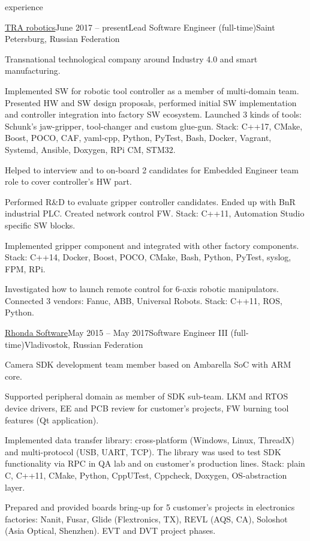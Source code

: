 \documentclass{template}
\begin{document}
\begin{rSection}{experience}
\begin{rCompany}{\href{https://www.tra.ai}{TRA robotics}}{June 2017 -- present}{Lead Software Engineer (full-time)}{Saint Petersburg, Russian Federation}

\item Transnational technological company around Industry 4.0 and smart manufacturing.
\item Implemented SW for robotic tool controller as a member of multi-domain team. Presented HW and SW design proposals, performed initial SW implementation and
      controller integration into factory SW ecosystem. Launched 3 kinds of tools: Schunk's jaw-gripper, tool-changer and custom glue-gun.
      Stack: C++17, CMake, Boost, POCO, CAF, yaml-cpp, Python, PyTest, Bash, Docker, Vagrant, Systemd, Ansible, Doxygen, RPi CM, STM32.
\item Helped to interview and to on-board 2 candidates for Embedded Engineer team role to cover controller's HW part.
\item Performed R\&D to evaluate gripper controller candidates. Ended up with BnR industrial PLC.
      Created network control FW. Stack: C++11, Automation Studio specific SW blocks.
\item Implemented gripper component and integrated with other factory components.
      Stack: C++14, Docker, Boost, POCO, CMake, Bash, Python, PyTest, syslog, FPM, RPi.
\item Investigated how to launch remote control for 6-axis robotic manipulators. Connected 3 vendors: Fanuc, ABB, Universal Robots. Stack: C++11, ROS, Python.

\end{rCompany}
\begin{rCompany}{\href{http://www.rhondasoftware.com}{Rhonda Software}}{May 2015 -- May 2017}{Software Engineer III (full-time)}{Vladivostok, Russian Federation}

\item Camera SDK development team member based on Ambarella SoC with ARM core.
\item Supported peripheral domain as member of SDK sub-team. LKM and RTOS device drivers, EE and PCB review for customer's projects,
      FW burning tool features (Qt application).
\item Implemented data transfer library: cross-platform (Windows, Linux, ThreadX) and multi-protocol (USB, UART, TCP). The library was used to test SDK functionality
      via RPC in QA lab and on customer's production lines. Stack: plain C, C++11, CMake, Python, CppUTest, Cppcheck, Doxygen, OS-abstraction layer.
\item Prepared and provided boards bring-up for 5 customer's projects in electronics factories: Nanit, Fusar, Glide (Flextronics, TX), REVL (AQS, CA),
      Soloshot (Asia Optical, Shenzhen). EVT and DVT project phases.


\end{rCompany}
\end{rSection}
\end{document}
